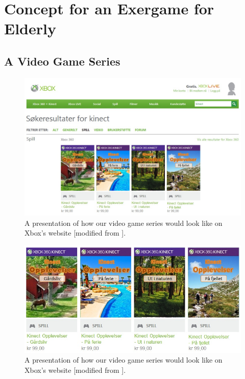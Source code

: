 \chapter{Concept for an Exergame for Elderly}


\section{A Video Game Series}
\begin{figure} [ht!]
\centering
\includegraphics[scale=0.5, angle=90]{SpillXboxNYNY.jpg}
\caption[Presentation of our video game series]{A presentation of how our video game series would look like on Xbox's website [modified from \cite{XboxNettside}].}
\label{fig:videogameseries}
\end{figure}

\begin{figure} [ht!]
\centering
\includegraphics[scale=0.6]{SpillXboxNY.png}
\caption[Presentation of our video game series]{A presentation of how our video game series would look like on Xbox's website [modified from \cite{XboxNettside}].}
\label{fig:videogameseries}
\end{figure}

